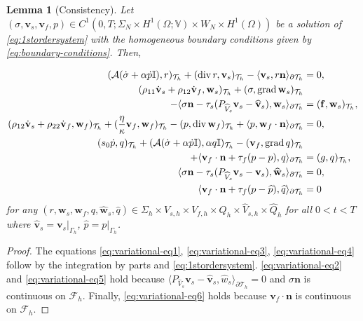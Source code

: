 \documentclass[10pt,letterpaper]{amsart}
\theoremstyle{plain} %
\newtheorem{lemma}[theorem]{Lemma} %
\theoremstyle{remark} %
\newcommand{\vect}[1]{\mathbf{#1}}
\newcommand{\divergence}{\mathrm{div}\,}
\newcommand{\grad}{\mathrm{grad}\,}
\newcommand{\Id}{\mathbb{I}} %
\newcommand{\Ael}{\mathcal{A}} %
\newcommand{\Thprod}[2]{( #1, #2 )_{\mathcal{T}_h}}
\newcommand{\pThprod}[2]{\langle #1, #2 \rangle_{\partial \mathcal{T}_{h}}}
\begin{document}
\begin{lemma}[Consistency]
	\label{lemma:consistency}
	Let \( (\sigma, \vect{v}_s, \vect{v}_f, p) \in C^1(0,T; \Sigma_N \times H^1(\Omega; \mathbb{V}) \times W_N \times H^1(\Omega)) \) be a solution of \eqref{eq:1stordersystem} with the homogeneous boundary conditions given by \eqref{eq:boundary-conditions}. Then, 
	
	\begin{subequations}
		\label{eq:variational-eqs}
		\begin{align}
			\label{eq:variational-eq1}
			\Thprod{\Ael(\dot{\sigma} + \alpha \dot{p} \Id)}{r} +\Thprod{\divergence r}{\vect{v}_{s}} -\pThprod{ \vect{v}_{s}}{r \vect{n}} &= 0 ,
			\\ 
			\label{eq:variational-eq2}
			\Thprod{\rho_{11}\dot{\vect{v}}_{s} + \rho_{12}\dot{\vect{v}}_{f}}{\vect{w}_{s}} + \Thprod{\sigma}{\grad \vect{w}_{s}} &
            \\
            \notag
            - \pThprod{\sigma \vect{n} - \tau_s ({P_{\widehat{V}_s}} \vect{v}_s - \widehat{\vect{v}}_s) }{\vect{w}_{s}} & = \Thprod{\vect{f}}{\vect{w}_{s}}, 
			\\
			\label{eq:variational-eq3}
			\Thprod{\rho_{12}\dot{\vect{v}}_{s} + \rho_{22}\dot{\vect{v}}_{f}}{\vect{w}_{f}} + \Thprod{\frac{\eta}{\kappa} \vect{v}_{f}}{\vect{w}_{f}} - \Thprod{p }{\divergence\vect{w}_{f}} +\pThprod{ p}{\vect{w}_{f}\cdot\vect{n}} & = 0, 
			\\
			\label{eq:variational-eq4}
			\Thprod{s_{0}\dot{p}}{q} + \Thprod{\Ael(\dot{\sigma}+\alpha \dot{p}\Id)}{\alpha q\Id} - \Thprod{\vect{v}_{f}}{\grad q} &
            \\
            \notag
            + \pThprod{\vect{v}_{f}\cdot \vect{n} + \tau_f (p - p)}{q} & = \Thprod{g}{q},
			\\
			\label{eq:variational-eq5}
			\pThprod{\sigma \vect{n} - \tau_s ({P_{\widehat{V}_s}} \vect{v}_s - {\vect{v}}_s) }{\widehat{\vect{w}}_s} & = 0,
			\\
			\label{eq:variational-eq6}
			\pThprod{\vect{v}_{f}\cdot \vect{n} + \tau_f (p - \widehat{p})}{\widehat{q}} & = 0
		\end{align}
	\end{subequations}
	for any $(r, \vect{w}_s, \vect{w}_f, q, \widehat{\vect{w}}_s, \widehat{q}) \in \Sigma_{h} \times V_{s,h} \times V_{f,h} \times Q_{h} \times \widehat{V}_{s,h}\times \widehat{Q}_{h}$ for all $0<t<T$ where $\widehat{\vect{v}}_s = \vect{v}_s|_{\Gamma_h}$, $\widehat{p} = p|_{\Gamma_h}$. 
\end{lemma}
%
\begin{proof}
	The equations \eqref{eq:variational-eq1}, \eqref{eq:variational-eq3}, \eqref{eq:variational-eq4} follow by the integration by parts and \eqref{eq:1stordersystem}. \eqref{eq:variational-eq2} and \eqref{eq:variational-eq5} hold because $\pThprod{{P_{\widehat{V}_s}} \vect{v}_s - \widehat{\vect{v}}_s}{\widehat{w}_s} =0$ and $\sigma \vect{n}$ is continuous on $\mathcal{F}_h$. Finally, \eqref{eq:variational-eq6} holds because $\vect{v}_f \cdot \vect{n}$ is continuous on $\mathcal{F}_h$. 
\end{proof}
\end{document}
